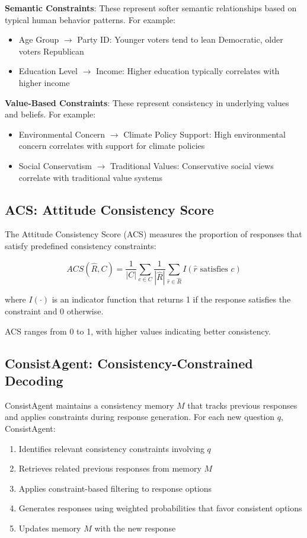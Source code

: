\documentclass[sigconf, anonymous]{acmart}
\begin{document}
\textbf{Semantic Constraints}: These represent softer semantic relationships based on typical human behavior patterns. For example:
\begin{itemize}
    \item Age Group $\rightarrow$ Party ID: Younger voters tend to lean Democratic, older voters Republican
    \item Education Level $\rightarrow$ Income: Higher education typically correlates with higher income
\end{itemize}

\textbf{Value-Based Constraints}: These represent consistency in underlying values and beliefs. For example:
\begin{itemize}
    \item Environmental Concern $\rightarrow$ Climate Policy Support: High environmental concern correlates with support for climate policies
    \item Social Conservatism $\rightarrow$ Traditional Values: Conservative social views correlate with traditional value systems
\end{itemize}

\subsection{ACS: Attitude Consistency Score}

The Attitude Consistency Score (ACS) measures the proportion of responses that satisfy predefined consistency constraints:

\[
ACS(\hat{R}, C) = \frac{1}{|C|} \sum_{c \in C} \frac{1}{|\hat{R}|} \sum_{\hat{r} \in \hat{R}} I(\hat{r} \text{ satisfies } c)
\]

where $I(\cdot)$ is an indicator function that returns 1 if the response satisfies the constraint and 0 otherwise.

ACS ranges from 0 to 1, with higher values indicating better consistency.

\subsection{ConsistAgent: Consistency-Constrained Decoding}

ConsistAgent maintains a consistency memory $M$ that tracks previous responses and applies constraints during response generation. For each new question $q$, ConsistAgent:

\begin{enumerate}
    \item Identifies relevant consistency constraints involving $q$
    \item Retrieves related previous responses from memory $M$
    \item Applies constraint-based filtering to response options
    \item Generates responses using weighted probabilities that favor consistent options
    \item Updates memory $M$ with the new response
\end{enumerate}
\end{document}
